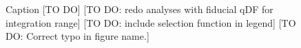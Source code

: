 
\begin{figure}
\caption{Caption [TO DO] [TO DO: redo analyses with fiducial qDF for integration range] [TO DO: include selection function in legend] [TO DO: Correct typo in figure name.]}
\label{fig:MW14vsKKS2SphFlex}
\end{figure}





